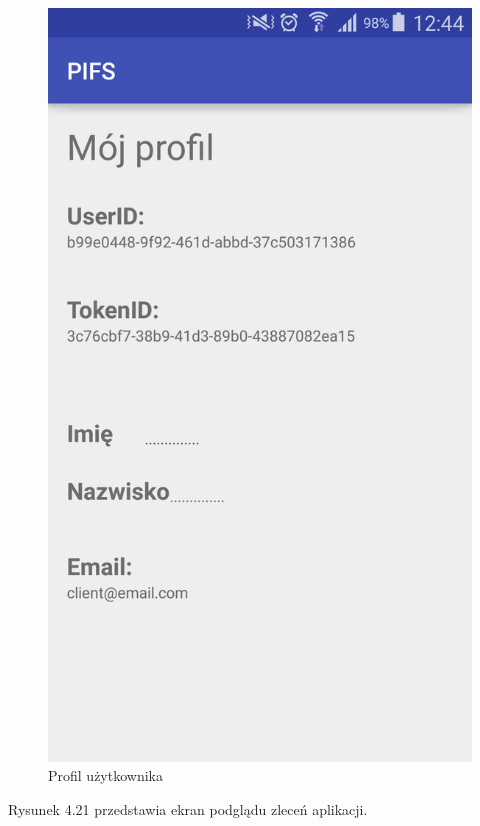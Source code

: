 \documentclass[a4paper,11pt]{article}
\begin{document}
\begin{figure}[h!]
	\centering
	\includegraphics[width=\textwidth,height=0.6\textheight]{profilPolski.png}
	\caption{Profil użytkownika}
\end{figure}

Rysunek 4.21 przedstawia ekran podglądu zleceń aplikacji.
\end{document}
